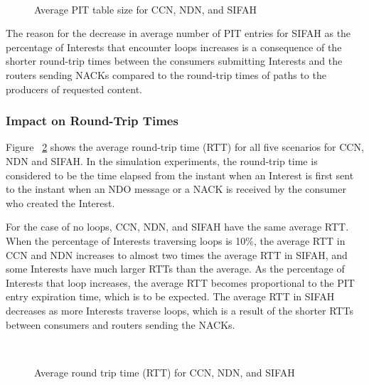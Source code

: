 \documentclass{ancs15-alternate}
\begin{document}
\begin{figure}[h]
\begin{centering}
    \mbox{
      }
       \vspace{-0.2in}
   \caption{Average PIT table size for CCN, NDN, and SIFAH}
   \label{PitSize}
\end{centering} 
\end{figure} 

The reason for the decrease in average number of PIT entries for SIFAH as the percentage of Interests that encounter  loops increases is a consequence of the shorter round-trip times between the consumers submitting Interests and the routers sending NACKs  compared to the   round-trip times of paths  to the producers of requested content.


\subsubsection{Impact on Round-Trip Times}


Figure ~\ref{RTT} shows the average round-trip time (RTT) for all five scenarios for CCN, NDN and SIFAH. In the simulation experiments, the round-trip time is considered to be the time elapsed  from the instant when an  Interest is first sent to the instant when an NDO message or a NACK is received by the consumer who created the Interest.  

For the case of no loops, CCN, NDN, and SIFAH have the same average RTT. 
When the percentage of Interests traversing loops is 10\%, the average RTT in CCN and NDN increases to almost two times the average RTT in SIFAH, and some Interests have much larger RTTs than the average. As the percentage of Interests that loop increases, the average RTT becomes proportional to the PIT entry expiration time, which is to be expected.
The average RTT in SIFAH decreases as more Interests traverse loops, which is a result of the shorter RTTs between consumers and routers sending the NACKs.


\begin{figure}[h]
\begin{centering}
    \mbox{
      }
\vspace{-0.2in}
   \caption{Average round trip time (RTT)  for CCN, NDN, and SIFAH}
   \label{RTT}
\end{centering} 
\end{figure} 
\end{document}
